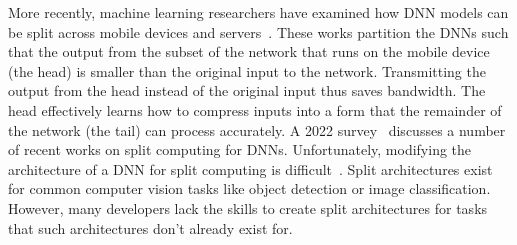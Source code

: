 More recently, machine learning researchers have examined how DNN models can be
split across mobile devices and servers~\cite{Kang2017, Hsu2019, Eshratifar2019,
  Matsubara2019}.
These works partition the DNNs such that the output from the subset of the
network that runs on the mobile device (the head) is smaller than the
original input to the network.
Transmitting the output from the head instead of the original input thus saves
bandwidth.
The head effectively learns how to compress inputs into a form that the
remainder of the network (the tail) can process accurately.
A 2022 survey~\cite{Matsubara2022} discusses a number of recent works on split
computing for DNNs.
Unfortunately, modifying the architecture of a DNN for split computing is
difficult~\cite{Matsubara2020}.
Split architectures exist for common computer vision tasks like object detection
or image classification.
However, many developers lack the skills to create split architectures for tasks
that such architectures don't already exist for.
